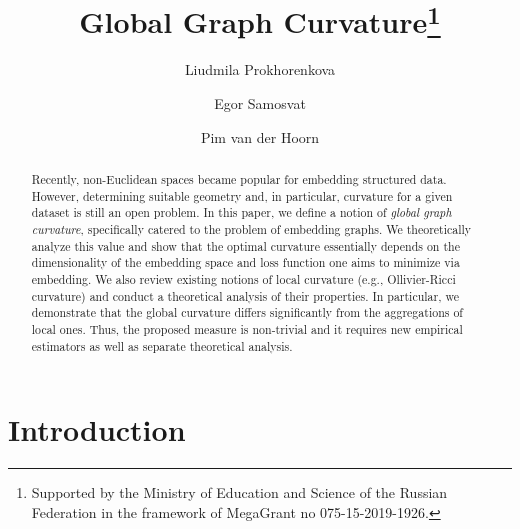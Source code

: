 \documentclass[runningheads]{llncs}
\begin{document}
%
\title{Global Graph Curvature\thanks{
Supported by the Ministry of Education and Science of the Russian Federation in the framework of MegaGrant no 075-15-2019-1926.}}
%
%
\author{Liudmila Prokhorenkova \and
Egor Samosvat \and
Pim van der Hoorn}
%
%
%
\maketitle              %
%
\begin{abstract}
Recently, non-Euclidean spaces became popular for embedding structured data. However, determining suitable geometry and, in particular, curvature for a given dataset is still an open problem. 
In this paper, we define a notion of \textit{global graph curvature}, specifically catered to the problem of embedding graphs.
We theoretically analyze this value and show that the optimal curvature essentially depends on the dimensionality of the embedding space and loss function one aims to minimize via embedding. 
We also review existing notions of local curvature (e.g., Ollivier-Ricci curvature) and conduct a theoretical analysis of their properties. 
In particular, we demonstrate that the
global curvature differs significantly from the aggregations of local ones. 
Thus, the proposed measure is non-trivial and it requires new empirical estimators as well as separate theoretical analysis.

\end{abstract}
%
%
%

\section{Introduction}
\end{document}
